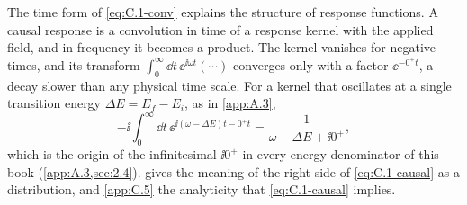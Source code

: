 The time form of \cref{eq:C.1-conv} explains the structure of response functions. A causal response is a convolution in time of a response kernel with the applied field, and in frequency it becomes a product. The kernel vanishes for negative times, and its transform $\int_0^\infty\dd t\,\ee^{\ii\omega t}(\cdots)$ converges only with a factor $\ee^{-0^+t}$, a decay slower than any physical time scale. For a kernel that oscillates at a single transition energy $\Delta E = E_f - E_i$, as in \cref{app:A.3},
\begin{equation}
  -\ii\int_0^\infty\dd t\,\ee^{\ii(\omega - \Delta E)t - 0^+t} = \frac{1}{\omega - \Delta E + \ii0^+} ,
  \label{eq:C.1-causal}
\end{equation}
which is the origin of the infinitesimal $\ii0^+$ in every energy denominator of this book (\cref{app:A.3,sec:2.4}).  gives the meaning of the right side of \cref{eq:C.1-causal} as a distribution, and \cref{app:C.5} the analyticity that \cref{eq:C.1-causal} implies.
